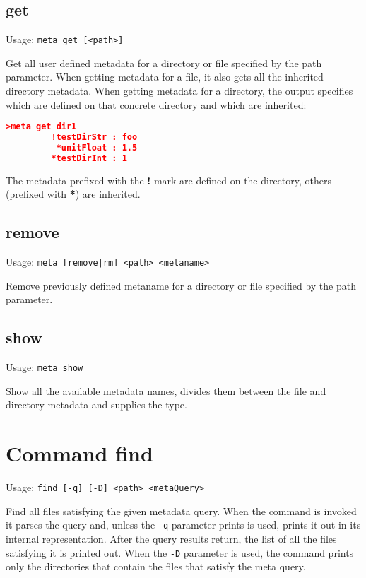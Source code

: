 \subsection{get}

Usage: \texttt{meta get [<path>]}

Get all user defined metadata for a directory or file specified by
the path parameter. When getting metadata for a file, it also gets
all the inherited directory metadata. When getting metadata for a
directory, the output specifies which are defined on that concrete
directory and which are inherited:
\begin{lstlisting}[language=json]
>meta get dir1
         !testDirStr : foo
          *unitFloat : 1.5
         *testDirInt : 1
\end{lstlisting}
The metadata prefixed with the \textbf{!} mark are defined on the
directory, others (prefixed with \textbf{*}) are inherited.

\subsection{remove}

Usage: \texttt{meta [remove|rm] <path> <metaname>}

Remove previously defined metaname for a directory or file
specified by the path parameter.

\subsection{show}

Usage: \texttt{meta show}

Show all the available metadata names, divides them between the
file and directory metadata and supplies the type.

\section{Command find}

Usage: \texttt{find [-q] [-D] <path> <metaQuery>}

Find all files satisfying the given metadata query. When the
command is invoked it parses the query and, unless the \texttt{-q}
parameter prints is used, prints it out in its internal
representation. After the query results return, the list of all
the files satisfying it is printed out. When the \texttt{-D}
parameter is used, the command prints only the directories
that contain the files that satisfy the meta query.

